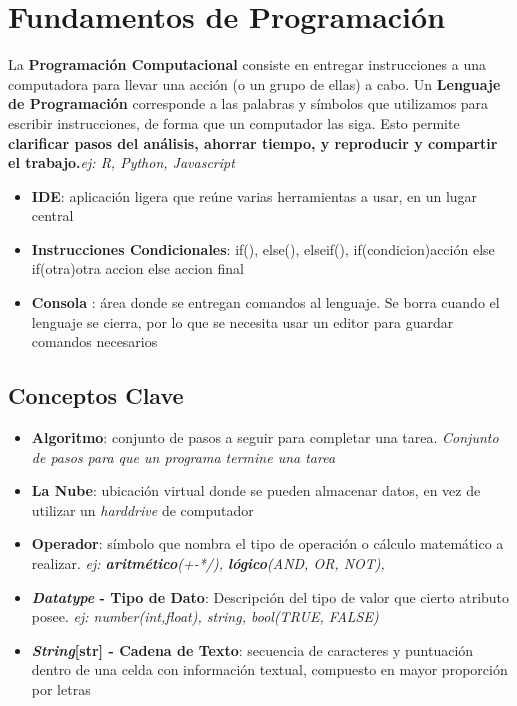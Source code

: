 
\section{Fundamentos de Programación}
La \textbf{Programación Computacional} consiste en entregar instrucciones a una computadora para llevar una acción (o un grupo de ellas) a cabo. Un \textbf{Lenguaje de Programación} corresponde a las palabras y símbolos que utilizamos para escribir instrucciones, de forma que un computador las siga. Esto permite \textbf{clarificar pasos del análisis, ahorrar tiempo, y reproducir y compartir el trabajo.}\textit{ej: R, Python, Javascript}
\begin{itemize}
    \item {\textbf{IDE}: aplicación ligera que reúne varias herramientas a usar, en un lugar central}
    \item {\textbf{Instrucciones Condicionales}: if(), else(), elseif(),
            if(condicion){acción} else if(otra){otra accion} else {accion final}}
    \item {\textbf{Consola} : área donde se entregan comandos al lenguaje. Se borra cuando el lenguaje se cierra, por lo que se necesita usar un editor para guardar comandos necesarios}
\end{itemize}

\subsection{Conceptos Clave}
\begin{itemize}
    \item {\textbf{Algoritmo}: conjunto de pasos a seguir para completar una tarea. \textit{Conjunto de pasos para que un programa termine una tarea}}
    \item {\textbf{La Nube}: ubicación virtual donde se pueden almacenar datos, en vez de utilizar un \textit{harddrive} de computador}
    \item {\textbf{Operador}: símbolo que nombra el tipo de operación o cálculo matemático a realizar. \textit{ej: \textbf{aritmético}(+-*/), \textbf{lógico}(AND, OR, NOT), }}
    \item {\textbf{\textit{Datatype} - Tipo de Dato}: Descripción del tipo de valor que cierto atributo posee. \textit{ej: number(int,float), string, bool(TRUE, FALSE)}}
    \item {\textbf{\textit{String}[str] - Cadena de Texto}: secuencia de caracteres y puntuación dentro de una celda con información textual, compuesto en mayor proporción por letras}
\end{itemize}